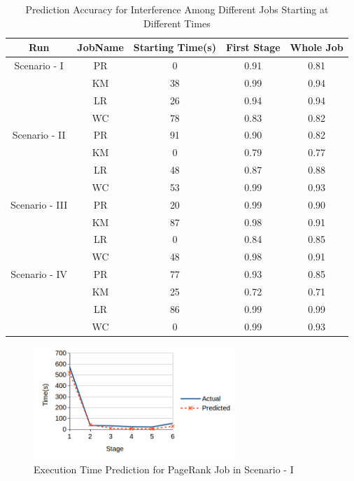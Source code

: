 \begin{table}[!t]
\renewcommand{\arraystretch}{1.3}
\caption {Prediction Accuracy for Interference Among Different Jobs Starting at Different Times}
\label{table_differentjob_differentstarttime}
\centering
\begin{tabular}{c|c|c|c|c}
\hline

\bfseries Run & \bfseries JobName & \bfseries Starting Time(s) & \bfseries First Stage & \bfseries Whole Job\\
\hline\hline
Scenario - I & PR & 0 & 0.91 & 0.81\\
& KM & 38 & 0.99 & 0.94\\
& LR & 26 & 0.94 & 0.94 \\
& WC & 78 & 0.83 & 0.82\\
\hline
Scenario - II & PR & 91 & 0.90 & 0.82\\
& KM & 0 & 0.79 & 0.77\\
& LR & 48 & 0.87 & 0.88\\
& WC & 53 & 0.99 & 0.93\\
\hline
Scenario - III & PR & 20 & 0.99 & 0.90\\
& KM & 87 & 0.98 & 0.91\\
& LR & 0 & 0.84 & 0.85\\
& WC & 48 & 0.98 & 0.91\\
\hline
Scenario - IV & PR & 77 & 0.93 & 0.85\\
& KM & 25 & 0.72 & 0.71\\
& LR & 86 & 0.99 & 0.99 \\
& WC & 0 & 0.99 & 0.93\\
\hline
\end{tabular}
\end{table} 




\begin{figure}[!t]
\centering
\captionsetup{justification=centering}
\includegraphics[width=3in]{figures/B_pr.png}
\caption{Execution Time Prediction for PageRank Job in Scenario - I}
\label{bpr}
\end{figure}

